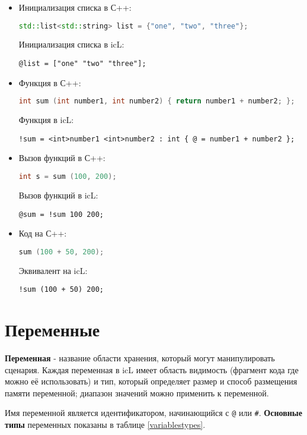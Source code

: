 \documentclass[a4paper, 14pt]{extarticle}
\newenvironment{icItems}
	{ \begin{itemize} [noitemsep,nolistsep] }
	{ \end{itemize} }
\begin{document}
\begin{icItems}
	\item Инициализация списка в С++:
\begin{lstlisting}[numbers=none, language=C++]
std::list<std::string> list = {"one", "two", "three"};
\end{lstlisting}
	Инициализация списка в icL:
\begin{lstlisting}[numbers=none]
@list = ["one" "two" "three"];
\end{lstlisting}
	\item Функция в С++:
\begin{lstlisting}[numbers=none, language=C++]
int sum (int number1, int number2) { return number1 + number2; };
\end{lstlisting}
	Функция в icL:
\begin{lstlisting}[numbers=none]
!sum = <int>number1 <int>number2 : int { @ = number1 + number2 };
\end{lstlisting}
	\item Вызов функций в С++:
\begin{lstlisting}[numbers=none, language=C++]
int s = sum (100, 200);
\end{lstlisting}
	Вызов функций в icL:
\begin{lstlisting}[numbers=none]
@sum = !sum 100 200;
\end{lstlisting}
	\item Код на С++:
\begin{lstlisting}[numbers=none, language=C++]
sum (100 + 50, 200);
\end{lstlisting}
	Эквивалент на icL:
\begin{lstlisting}[numbers=none]
!sum (100 + 50) 200;
\end{lstlisting}
\end{icItems}

\newpage
\section{Переменные}

\textbf{Переменная} - название области хранения, который могут манипулировать сценария. Каждая переменная в icL имеет область видимость (фрагмент кода где можно её использовать) и тип, который определяет размер и способ размещения памяти переменной; диапазон значений можно применить к переменной.

Имя переменной является идентификатором, начинающийся с \lstinline`@` или {\color{blue2}\lstinline`#`}.
\textbf{Основные типы} переменных показаны в таблице \ref{variablestypes}.
\end{document}
